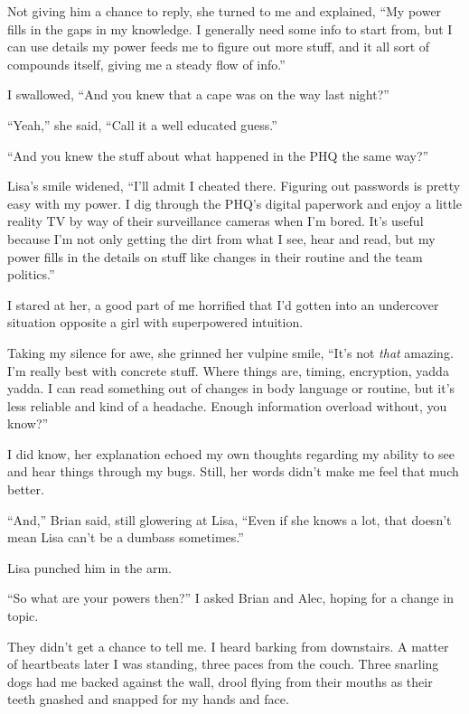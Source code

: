 Not giving him a chance to reply, she turned to me and explained, ``My power fills in the gaps in my knowledge.  I generally need some info to start from, but I can use details my power feeds me to figure out more stuff, and it all sort of compounds itself, giving me a steady flow of info.''



I swallowed, ``And you knew that a cape was on the way last night?''



``Yeah,'' she said, ``Call it a well educated guess.''



``And you knew the stuff about what happened in the PHQ the same way?''



Lisa's smile widened, ``I'll admit I cheated there.  Figuring out passwords is pretty easy with my power.  I dig through the PHQ's digital paperwork and enjoy a little reality TV by way of their surveillance cameras when I'm bored.  It's useful because I'm not only getting the dirt from what I see, hear and read, but my power fills in the details on stuff like changes in their routine and the team politics.''



I stared at her, a good part of me horrified that I'd gotten into an undercover situation opposite a girl with superpowered intuition.



Taking my silence for awe, she grinned her vulpine smile, ``It's not \emph{that} amazing.  I'm really best with concrete stuff.  Where things are, timing, encryption, yadda yadda.  I can read something out of changes in body language or routine, but it's less reliable and kind of a headache.  Enough information overload without, you know?''



I did know, her explanation echoed my own thoughts regarding my ability to see and hear things through my bugs.  Still, her words didn't make me feel that much better.



``And,'' Brian said, still glowering at Lisa, ``Even if she knows a lot, that doesn't mean Lisa can't be a dumbass sometimes.''



Lisa punched him in the arm.



``So what are your powers then?'' I asked Brian and Alec, hoping for a change in topic.



They didn't get a chance to tell me.  I heard barking from downstairs.  A matter of heartbeats later I was standing, three paces from the couch.  Three snarling dogs had me backed against the wall, drool flying from their mouths as their teeth gnashed and snapped for my hands and face.





